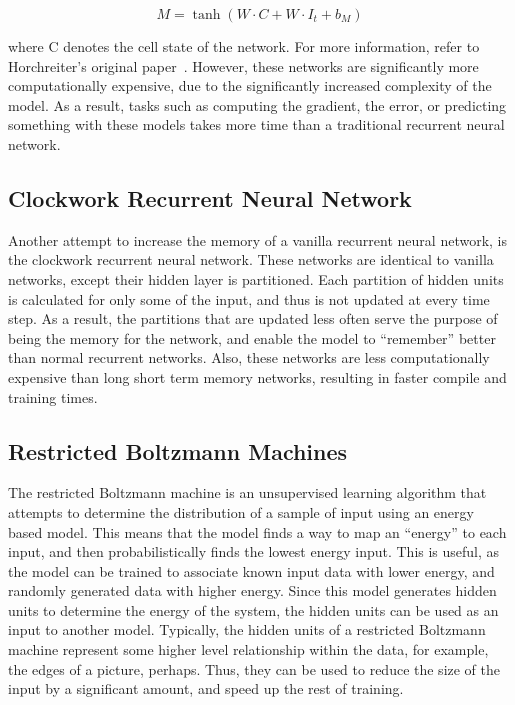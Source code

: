 \documentclass{article}
\begin{document}
$$M = \tanh(W\cdot C + W\cdot I_t + b_M)$$

where C denotes the cell state of the network. For more information, refer to
Horchreiter's original paper~\cite{lstm}. However, these networks are
significantly more computationally expensive, due to the significantly increased
complexity of the model. As a result, tasks such as computing the gradient, the
error, or predicting something with these models takes more time than a
traditional recurrent neural network.

\subsection{Clockwork Recurrent Neural Network}
Another attempt to increase the memory of a vanilla recurrent neural network, is
the clockwork recurrent neural network. These networks are identical to vanilla
networks, except their hidden layer is partitioned. Each partition of hidden
units is calculated for only some of the input, and thus is not updated at every
time step. As a result, the partitions that are updated less often serve the
purpose of being the memory for the network, and enable the model to
``remember'' better than normal recurrent networks. Also, these networks are
less computationally expensive than long short term memory networks, resulting
in faster compile and training times.

\subsection{Restricted Boltzmann Machines}
The restricted Boltzmann machine is an unsupervised learning algorithm that
attempts to determine the distribution of a sample of input using an energy
based model. This means that the model finds a way to map an ``energy'' to each
input, and then probabilistically finds the lowest energy input. This is useful,
as the model can be trained to associate known input data with lower energy, and
randomly generated data with higher energy. Since this model generates hidden
units to determine the energy of the system, the hidden units can be used as an
input to another model. Typically, the hidden units of a restricted Boltzmann
machine represent some higher level relationship within the data, for example,
the edges of a picture, perhaps. Thus, they can be used to reduce the size of
the input by a significant amount, and speed up the rest of training.
\end{document}
